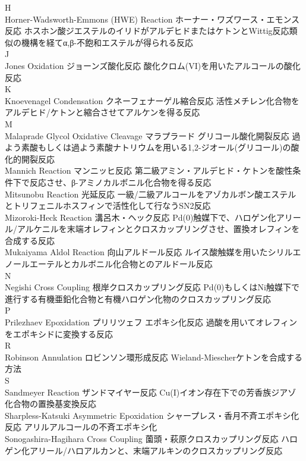 \documentclass[dvipdfmx,uplatex]{jsarticle}
\begin{document}
H \\
Horner-Wadsworth-Emmons (HWE) Reaction	ホーナー・ワズワース・エモンス反応
	ホスホン酸ジエステルのイリドがアルデヒドまたはケトンとWittig反応類似の機構を経てα,β-不飽和エステルが得られる反応 \\
J \\
Jones Oxidation	ジョーンズ酸化反応
	酸化クロム(VI)を用いたアルコールの酸化反応 \\
K \\
Knoevenagel Condensation	クネーフェナーゲル縮合反応
	活性メチレン化合物をアルデヒド/ケトンと縮合させてアルケンを得る反応 \\
M \\
Malaprade Glycol Oxidative Cleavage	マラプラード グリコール酸化開裂反応
	過よう素酸もしくは過よう素酸ナトリウムを用いる1,2-ジオール(グリコール)の酸化的開裂反応 \\
Mannich Reaction	マンニッヒ反応
	第二級アミン・アルデヒド・ケトンを酸性条件下で反応させ、β-アミノカルボニル化合物を得る反応 \\ 
Mitsunobu Reaction	光延反応
	一級/二級アルコールをアゾカルボン酸エステルとトリフェニルホスフィンで活性化して行なうSN2反応 \\
Mizoroki-Heck Reaction	溝呂木・ヘック反応
	Pd(0)触媒下で、ハロゲン化アリール/アルケニルを末端オレフィンとクロスカップリングさせ、置換オレフィンを合成する反応 \\
Mukaiyama Aldol Reaction	向山アルドール反応
	ルイス酸触媒を用いたシリルエノールエーテルとカルボニル化合物とのアルドール反応 \\
N \\
Negishi Cross Coupling	根岸クロスカップリング反応
	Pd(0)もしくはNi触媒下で進行する有機亜鉛化合物と有機ハロゲン化物のクロスカップリング反応 \\
P \\
Prilezhaev Epoxidation	プリリツェフ エポキシ化反応
	過酸を用いてオレフィンをエポキシドに変換する反応 \\
R \\
Robinson Annulation	ロビンソン環形成反応
	Wieland-Miescherケトンを合成する方法 \\
S \\
Sandmeyer Reaction	ザンドマイヤー反応
	Cu(I)イオン存在下での芳香族ジアゾ化合物の置換基変換反応 \\
Sharpless-Katsuki Asymmetric Epoxidation	シャープレス・香月不斉エポキシ化反応
	アリルアルコールの不斉エポキシ化 \\
Sonogashira-Hagihara Cross Coupling	薗頭・萩原クロスカップリング反応
	ハロゲン化アリール/ハロアルカンと、末端アルキンのクロスカップリング反応 \\
\end{document}
